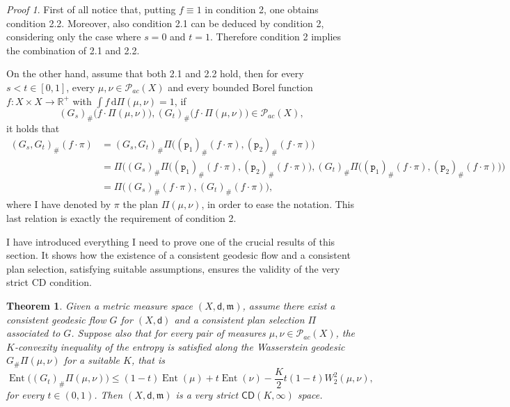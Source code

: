 \documentclass[11pt,twoside,a4paper]{article}
\newcommand{\R}{\mathbb{R}}
\newcommand{\p}{\mathtt p} %
\newcommand{\de}{\ensuremath{\, \mathrm d}} %
\newcommand{\thmsymbol}{\( \square \)}
\newcommand{\CD}{\mathsf{CD}}
\newcommand{\di}{\mathsf d} %
\newcommand{\m}{\mathfrak m} %
\DeclareMathOperator{\Ent}{Ent}
\newcommand{\Prob}{\mathscr{P}}
\theoremstyle{theorem}
\newtheorem{theorem}{Theorem}[section]
\theoremstyle{definition}
\theoremstyle{remark}
\theoremstyle{proof}
\newtheorem*{pro}{Proof}
\newenvironment{pr}{\begin{pro}%
 \renewcommand{\qedsymbol}{\thmsymbol}\pushQED{\qed}}%
 {\popQED\end{pro}}
\begin{document}
\begin{pr}
First of all notice that, putting $f\equiv 1$ in condition 2, one obtains condition 2.2. Moreover, also condition 2.1 can be deduced by condition 2, considering only the case where $s=0$ and $t=1$. Therefore condition 2 implies the combination of 2.1 and 2.2.

On the other hand, assume that both 2.1 and 2.2 hold, then for every $s<t\in [0,1]$, every $\mu,\nu\in \Prob_{ac}(X)$ and every bounded Borel function $f:X\times X\to \R^+$ with $\int f \de \Pi(\mu,\nu)=1$, if 
    \begin{equation*}
        (G_s)_\# \big(f \cdot \Pi(\mu,\nu)\big), (G_t)_\# \big(f \cdot \Pi(\mu,\nu)\big) \in \Prob_{ac}(X),
    \end{equation*}
    it holds that
 \begin{align*}
     (G_s,G_t)_\# (f\cdot \pi) &=  (G_s,G_t)_\# \Pi\big( (\p_1)_\#(f\cdot \pi), (\p_2)_\#(f\cdot \pi)\big)\\
     &= \Pi\bigg( (G_s)_\# \Pi\big( (\p_1)_\#(f\cdot \pi), (\p_2)_\#(f\cdot \pi)\big), (G_t)_\# \Pi\big( (\p_1)_\#(f\cdot \pi), (\p_2)_\#(f\cdot \pi)\big)\bigg) \\
     &= \Pi \bigg((G_s)_\# (f\cdot \pi), (G_t)_\# (f \cdot \pi) \bigg),
 \end{align*}
where I have denoted by $\pi$ the plan $\Pi(\mu,\nu)$, in order to ease the notation. This last relation is exactly the requirement of condition 2. 
\end{pr}

I have introduced everything I need to prove one of the crucial results of this section. It shows how the existence of a consistent geodesic flow and a consistent plan selection, satisfying suitable assumptions, ensures the validity of the very strict CD condition.

\begin{theorem}\label{thm:verystrict}
Given a metric measure space $(X,\di, \m)$, assume there exist a consistent geodesic flow $G$ for $(X,\di)$ and a consistent plan selection $\Pi$ associated to $G$. Suppose also that for every pair of measures $\mu,\nu\in \Prob_{ac}(X)$, the $K$-convexity inequality of the entropy is satisfied along the Wasserstein geodesic $G_\# \Pi(\mu,\nu)$ for a suitable $K$, that is 
\begin{equation*}
    \Ent\big((G_t)_\# \Pi(\mu,\nu) \big) \leq (1-t) \Ent(\mu)+ t\Ent(\nu) - \frac K 2 t(1-t) W_2^2(\mu,\nu),
\end{equation*}
for every $t\in(0,1)$. Then $(X,\di,\m)$ is a very strict $\CD(K,\infty)$ space.
\end{theorem}
\end{document}
